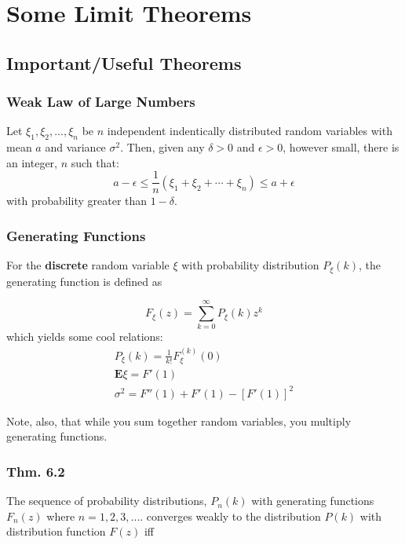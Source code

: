 
\chapter{Some Limit Theorems}

\section{Important/Useful Theorems}

\subsection{Weak Law of Large Numbers}
Let $\xi_1, \xi_2, ..., \xi_n$ be $n$ independent indentically distributed random variables with mean $a$ and variance $\sigma^2$.  Then, given any $\delta > 0$ and $\epsilon >0$, however small, there is an integer, $n$ such that:
\begin{equation}
	a- \epsilon \leq \frac{1}{n}(\xi_1 +\xi_2 + \cdots + \xi_n) \leq a + \epsilon
\end{equation}
with probability greater than $1- \delta$.


\subsection{Generating Functions}

For the \textbf{discrete} random variable $\xi$ with probability distribution $P_{\xi}(k)$, the generating function is defined as

\begin{equation}
	F_{\xi}(z) = \sum_{k=0}^{\infty}P_{\xi}(k)z^k
\end{equation}
which yields some cool relations:
\begin{eqnarray}
	P_{\xi}(k) = \frac{1}{k!}F_{\xi}^{(k)}(0) \\
	\textbf{E}\xi = F'(1) \\
	\sigma^2 =F''(1) + F'(1) - [F'(1)]^2
\end{eqnarray}

Note, also, that while you sum together random variables, you multiply generating functions.

\subsection{Thm. 6.2}

The sequence of probability distributions, $P_n(k)$ with generating functions $F_n(z)$ where $n=1, 2, 3, ....$ converges weakly to the distribution $P(k)$ with distribution function $F(z)$ iff  

